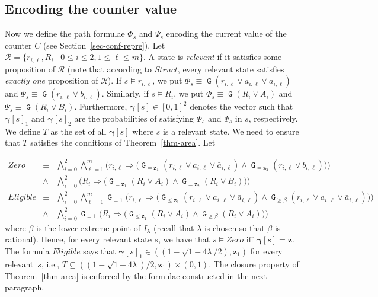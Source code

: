 \documentclass[a4paper,UKenglish,cleveref, autoref, thm-restate]{lipics-v2021}
\newcommand{\calR}{\mathcal{R}}
\newcommand{\Zero}{\mathit{Zero}}
\renewcommand{\vec}[1]{\pmb{#1}}
\newcommand{\Struct}{\textit{Struct}}
\newcommand{\Eligible}{\textit{Eligible}}
\newcommand{\cv}{\vec{\gamma}}
\newcommand*{\opg}{\operatorname{\pmb{\mathtt{G}}}}
\begin{document}
\subsection{Encoding the counter value}
Now we define the path formulae $\Phi_s$ and $\Psi_s$ encoding the current value of the counter $C$ (see Section~\ref{sec-conf-repre}). Let $\calR = \{r_{i,\ell},R_i \mid 0 \leq i \leq 2, 1 \leq \ell \leq m\}$. A state is \emph{relevant} if it satisfies some proposition of $\calR$ (note that according to $\Struct$, every relevant state satisfies \emph{exactly one} proposition of $\calR$). 
If $s \models r_{i,\ell}$, we put $\Phi_s \equiv \opg(r_{i,\ell} {\vee} a_{i,\ell} \vee \bar{a}_{i,\ell})$ and $\Psi_s \equiv \opg(r_{i,\ell} {\vee} b_{i,\ell})$. Similarly, if $s \models R_i$, we put $\Phi_s \equiv \opg(R_i {\vee} A_i)$ and $\Psi_s \equiv \opg(R_i {\vee} B_i)$. 
Furthermore, $\cv[s] \in [0,1]^2$ denotes the vector such that $\cv[s]_1$ and $\cv[s]_2$ are the probabilities of satisfying $\Phi_s$ and $\Psi_s$ in $s$, respectively.
We define $T$ as the set of all $\cv[s]$ where $s$ is a relevant state. We need to ensure that $T$ satisfies the conditions of Theorem~\ref{thm-area}.
Let

\begin{eqnarray*}
    \Zero & \equiv & 
    \bigwedge_{i=0}^2  \bigwedge_{\ell=1}^m   
    \bigg(r_{i,\ell} \Rightarrow \big(\opg_{=\vec{z}_1}(r_{i,\ell} {\vee} a_{i,\ell} {\vee} \bar{a}_{i,\ell}) \wedge \opg_{=\vec{z}_2}(r_{i,\ell} {\vee} b_{i,\ell}) \big) \bigg)\\
     & \wedge &   \bigwedge_{i=0}^2 
    \bigg(R_i \Rightarrow \big(\opg_{=\vec{z}_1}(R_i {\vee} A_i) \wedge \opg_{=\vec{z}_2}(R_i {\vee} B_i) \big) \bigg)\\[2ex]
    \Eligible & \equiv & \bigwedge_{i=0}^2  \bigwedge_{\ell=1}^m 
    \opg_{=1} \bigg( 
    r_{i,\ell} \Rightarrow  \big(\opg_{\leq \vec{z}_1}(r_{i,\ell} {\vee} a_{i,\ell} {\vee} \bar{a}_{i,\ell}) 
    \wedge \opg_{\geq \beta}(r_{i,\ell} {\vee} a_{i,\ell} {\vee} \bar{a}_{i,\ell})\big) \bigg)\\
    & \wedge & \bigwedge_{i=0}^2 
    \opg_{=1} \bigg(
    R_i \Rightarrow  \big(\opg_{\leq \vec{z}_1}(R_i {\vee} A_i) 
    \wedge \opg_{\geq \beta}(R_i {\vee} A_i)\big)
    \bigg)
\end{eqnarray*}
where $\beta$ is the lower extreme point of $I_\lambda$ (recall that $\lambda$ is chosen so that $\beta$ is rational). Hence, for every relevant state $s$, we have that $s \models \Zero$ iff $\cv[s] = \vec{z}$. The formula $\Eligible$ says that $\cv[s]_1 \in ((1{-}\sqrt{1{-}4\lambda}/2),\vec{z}_1)$ for every relevant~$s$, i.e., $T \subseteq ((1{-}\sqrt{1{-}4\lambda})/2,\vec{z}_1) \times (0,1)$. The closure property of Theorem~\ref{thm-area} is enforced by the formulae constructed in the next paragraph.
\end{document}
